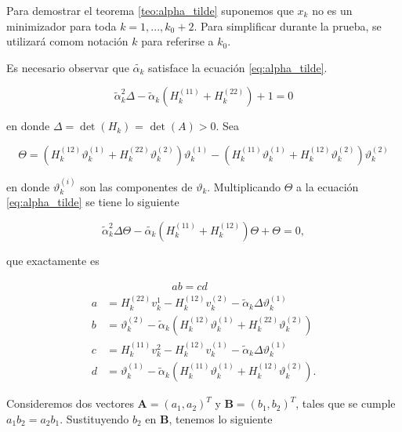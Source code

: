 Para demostrar el teorema \ref{teo:alpha_tilde} suponemos que $x_k$ no es un minimizador para toda $k=1, ..., k_0+2$. Para simplificar durante la prueba, se utilizará comom notación $k$ para referirse a $k_0$.

Es necesario observar que $\tilde{\alpha_k}$ satisface la ecuación \ref{eq:alpha_tilde}.

\begin{equation}
    \tilde{\alpha}^2_k\Delta-\tilde{\alpha}_k\left(H^{(11)}_k + H_k^{(22)}\right) + 1 = 0
    \label{eq:alpha_tilde}
\end{equation}

en donde $\Delta = \det{(H_k)}$ = $\det{(A)}>0$. Sea

\begin{equation*}
    \Theta = \left(H_k^{(12)}\vartheta_k^{(1)}+ H_k^{(22)}\vartheta^{(2)}_k\right)\vartheta_k^{(1)} -  \left(H_k^{(11)}\vartheta_k^{(1)}+ H_k^{(12)}\vartheta^{(2)}_k\right)\vartheta_k^{(2)}
\end{equation*}

en donde $\vartheta_k^{(i)}$ son las componentes de $\vartheta_k$. Multiplicando $\Theta$ a la ecuación \ref{eq:alpha_tilde} se tiene lo siguiente

\begin{equation*}
    \tilde{\alpha}_k^2\Delta\Theta-\tilde{\alpha_k}\left(H_k^{(11)}+H_k^{(12)}\right)\Theta + \Theta = 0,
\end{equation*}

que exactamente es

\begin{align*}
      & \qquad \qquad \qquad ab  =cd                                                                    \\
    a & = H_k^{(22)}v_k^{1}-H_k^{(12)}v_k^{(2)}-\tilde{\alpha}_k\Delta\vartheta_k^{(1)}                 \\
    b & = \vartheta_k ^{(2)}-\tilde{\alpha}_k(H_k^{(12)}\vartheta_k^{(1)}+H_k^{(22)}\vartheta_k^{(2)})  \\
    c & = H_k^{(11)}v_k^{2}-H_k^{(12)}v_k^{(1)}-\tilde{\alpha}_k\Delta\vartheta_k^{(1)}                 \\
    d & = \vartheta_k ^{(1)}-\tilde{\alpha}_k(H_k^{(11)}\vartheta_k^{(1)}+H_k^{(12)}\vartheta_k^{(2)}).
\end{align*}

Consideremos dos vectores $\boldsymbol{A} = (a_1, a_2)^T$ y $\boldsymbol{B} = (b_1, b_2)^T$, tales que se cumple $a_1b_2 = a_2b_1$. Sustituyendo $b_2$ en $\boldsymbol{B}$, tenemos lo siguiente

